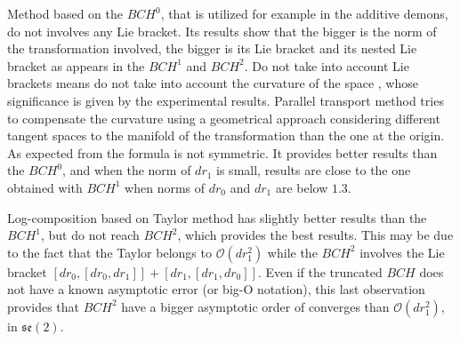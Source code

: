 Method based on the $BCH^0$, that is utilized for example in the additive demons, do not involves any Lie bracket. Its results show that the bigger is the norm of the transformation involved, the bigger is its Lie bracket and its nested Lie bracket as appears in the $BCH^1$ and $BCH^2$. Do not take into account Lie brackets means do not take into account the curvature of the space \cite{misner1973gravitation}, whose significance is given by the experimental results. Parallel transport method tries to compensate the curvature using a geometrical approach considering different tangent spaces to the manifold of the transformation than the one at the origin. As expected from the formula is not symmetric. It provides better results than the $BCH^0$, and when the norm of $dr_1$ is small, results are close to the one obtained with $BCH^1$ when norms of $dr_0$ and $dr_1$ are below $1.3$.

Log-composition based on Taylor method has slightly better results than the $BCH^1$, but do not reach $BCH^2$, which provides the best results. This may be due to the fact that the Taylor belongs to $\mathcal{O}(dr_1^2)$ while the $BCH^2$ involves the Lie bracket $[dr_0,[dr_0, dr_1]] + [dr_1,[dr_1, dr_0]]$. Even if the truncated $BCH$ does not have a known asymptotic error (or big-O notation), this last observation provides that $BCH^2$ have a bigger asymptotic order of converges than $\mathcal{O}(dr_1^2)$, in $\mathfrak{se}(2)$.


